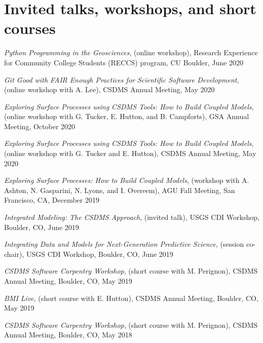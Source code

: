 \section{Invited talks, workshops, and short courses}
\vspace{0.5em}

\begin{enumerate}[{[}1{]}]

  \item \textit{Python Programming in the Geosciences}, (online
    workshop), Research Experience for Community College Students
    (RECCS) program, CU Boulder, June 2020

  \item \textit{Git Good with FAIR Enough Practices for Scientific
    Software Development}, (online workshop with A. Lee), CSDMS
    Annual Meeting, May 2020

  \item \textit{Exploring Surface Processes using CSDMS Tools: How to
    Build Coupled Models}, (online workshop with G. Tucker, E. Hutton,
    and B. Campforts), GSA Annual Meeting, October 2020

  \item \textit{Exploring Surface Processes using CSDMS Tools: How to
    Build Coupled Models}, (online workshop with G. Tucker and
    E. Hutton), CSDMS Annual Meeting, May 2020

  \item \textit{Exploring Surface Processes: How to Build Coupled
    Models}, (workshop with A. Ashton, N. Gasparini, N. Lyons, and
    I. Overeem), AGU Fall Meeting, San Francisco, CA, December 2019

  \item \textit{Integrated Modeling: The CSDMS Approach}, (invited
    talk), USGS CDI Workshop, Boulder, CO, June 2019

  \item \textit{Integrating Data and Models for Next-Generation
    Predictive Science}, (session co-chair), USGS CDI Workshop,
    Boulder, CO, June 2019
    
  \item \textit{CSDMS Software Carpentry Workshop}, (short course with
    M. Perignon), CSDMS Annual Meeting, Boulder, CO, May 2019

  \item \textit{BMI Live}, (short course with E. Hutton),
    CSDMS Annual Meeting, Boulder, CO, May 2019

  \item \textit{CSDMS Software Carpentry Workshop}, (short course with
    M. Perignon), CSDMS Annual Meeting, Boulder, CO, May 2018


\end{enumerate}
